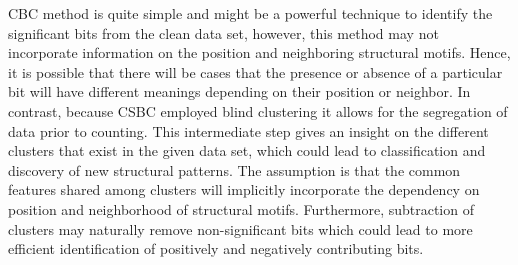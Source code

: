 CBC method is quite simple and might be a powerful technique to identify the significant bits from the clean data set, however, this method may not incorporate information on the position and neighboring structural motifs. Hence, it is possible that there will be cases that the presence or absence of a particular bit will have different meanings depending on their position or neighbor. In contrast, because CSBC employed blind clustering it allows for the segregation of data prior to counting. This intermediate  step gives an insight on the different clusters that exist in the given data set, which could lead to classification and discovery of new structural patterns. The assumption is that the common features shared among clusters will implicitly incorporate the dependency on position and neighborhood of structural motifs. Furthermore, subtraction of clusters  may naturally remove non-significant bits which could lead to more efficient identification of positively and negatively contributing bits. 



